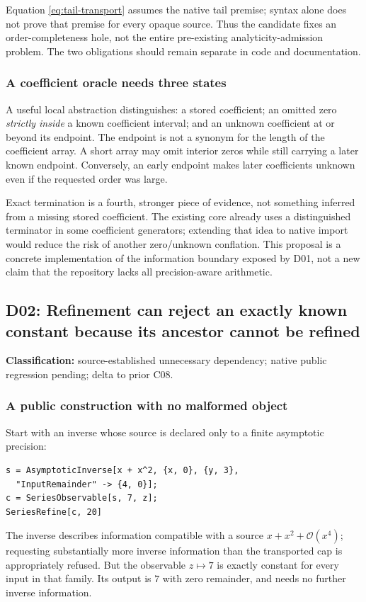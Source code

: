 \documentclass[11pt,letterpaper]{article}
\newcommand{\code}[1]{\texttt{\detokenize{#1}}}
\newcommand{\OO}{\mathcal O}
\newcommand{\finding}[3]{\subsection{#1: #2}\textbf{Classification:} #3.\par}
\begin{document}
Equation \eqref{eq:tail-transport} assumes the native tail premise; \code{SeriesData} syntax alone does not prove that premise for every opaque source. Thus the candidate fixes an order-completeness hole, not the entire pre-existing analyticity-admission problem. The two obligations should remain separate in code and documentation.

\subsubsection*{A coefficient oracle needs three states}

A useful local abstraction distinguishes: a stored coefficient; an omitted zero \emph{strictly inside} a known coefficient interval; and an unknown coefficient at or beyond its endpoint. The endpoint is not a synonym for the length of the coefficient array. A short array may omit interior zeros while still carrying a later known endpoint. Conversely, an early endpoint makes later coefficients unknown even if the requested order was large.

Exact termination is a fourth, stronger piece of evidence, not something inferred from a missing stored coefficient. The existing core already uses a distinguished terminator in some coefficient generators; extending that idea to native import would reduce the risk of another zero/unknown conflation. This proposal is a concrete implementation of the information boundary exposed by D01, not a new claim that the repository lacks all precision-aware arithmetic.

\finding{D02}{Refinement can reject an exactly known constant because its ancestor cannot be refined}{source-established unnecessary dependency; native public regression pending; delta to prior C08}

\subsubsection*{A public construction with no malformed object}

Start with an inverse whose source is declared only to a finite asymptotic precision:
\begin{lstlisting}
s = AsymptoticInverse[x + x^2, {x, 0}, {y, 3},
  "InputRemainder" -> {4, 0}];
c = SeriesObservable[s, 7, z];
SeriesRefine[c, 20]
\end{lstlisting}
The inverse describes information compatible with a source $x+x^2+\OO(x^4)$; requesting substantially more inverse information than the transported cap is appropriately refused. But the observable $z\mapsto7$ is exactly constant for every input in that family. Its output is $7$ with zero remainder, and needs no further inverse information.
\end{document}
